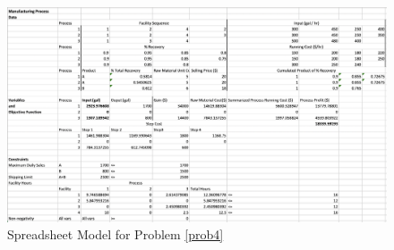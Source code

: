 \begin{figure}
    \centering
    \includegraphics[width=0.9\textheight,angle=90]{hw1/hw1-prob4.png}
    \caption{Spreadsheet Model for Problem \ref{prob4}}
    \label{fig:my_label}
\end{figure}


